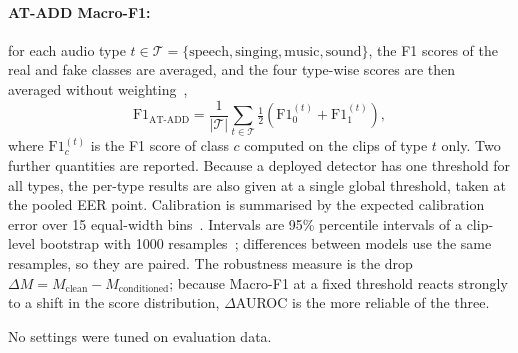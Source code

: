 \paragraph{AT-ADD Macro-F1:} for each audio type $t \in \mathcal{T} = \{\text{speech}, \text{singing}, \text{music}, \text{sound}\}$, the F1 scores of the real and fake classes are averaged, and the four type-wise scores are then averaged without weighting~\cite{xie2026atadd},
\begin{equation}
\mathrm{F1}_{\mathrm{AT\text{-}ADD}} = \frac{1}{|\mathcal{T}|}\sum_{t \in \mathcal{T}} \tfrac{1}{2}\left(\mathrm{F1}_{0}^{(t)} + \mathrm{F1}_{1}^{(t)}\right),
\label{eq:atadd}
\end{equation}
where $\mathrm{F1}_{c}^{(t)}$ is the F1 score of class $c$ computed on the clips of type $t$ only. Two further quantities are reported. Because a deployed detector has one threshold for all types, the per-type results are also given at a single global threshold, taken at the pooled EER point. Calibration is summarised by the expected calibration error over 15 equal-width bins~\cite{guo2017calibration}. Intervals are 95\% percentile intervals of a clip-level bootstrap with 1000 resamples~\cite{efron1993bootstrap}; differences between models use the same resamples, so they are paired. The robustness measure is the drop $\Delta M = M_{\mathrm{clean}}-M_{\mathrm{conditioned}}$; because Macro-F1 at a fixed threshold reacts strongly to a shift in the score distribution, $\Delta$AUROC is the more reliable of the three.

No settings were tuned on evaluation data.
